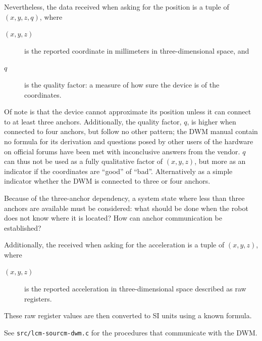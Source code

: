 Nevertheless, the data received when asking for the position is a tuple of
$(x, y, z, q)$, where
\begin{description}
\item[$(x, y, z)$] is the reported coordinate in millimeters in three-dimensional space, and
\item[$q$] is the quality factor: a measure of how sure the device is of the coordinates.
\end{description}

Of note is that the device cannot approximate its position unless it can connect to at least three anchors.
Additionally, the quality factor, $q$, is higher when connected to four anchors, but follow no other pattern;
the DWM manual contain no formula for its derivation and questions posed by other users of the hardware on official forums have been met with inconclusive answers from the vendor.
$q$ can thus not be used as a fully qualitative factor of $(x, y, z)$, but more as an indicator if the coordinates are ``good'' of ``bad''.
Alternatively as a simple indicator whether the DWM is connected to three or four anchors.

Because of the three-anchor dependency, a system state where less than three anchors are available must be considered:
what should be done when the robot does not know where it is located?
How can anchor communication be established?

Additionally, the received when asking for the acceleration is a tuple of $(x, y, z)$, where
\begin{description}
\item[$(x, y, z)$] is the reported acceleration in three-dimensional space described as raw registers.
\end{description}
These raw register values are then converted to SI units using a known formula.

See \verb|src/lcm-sourcm-dwm.c| for the procedures that communicate with the DWM.



